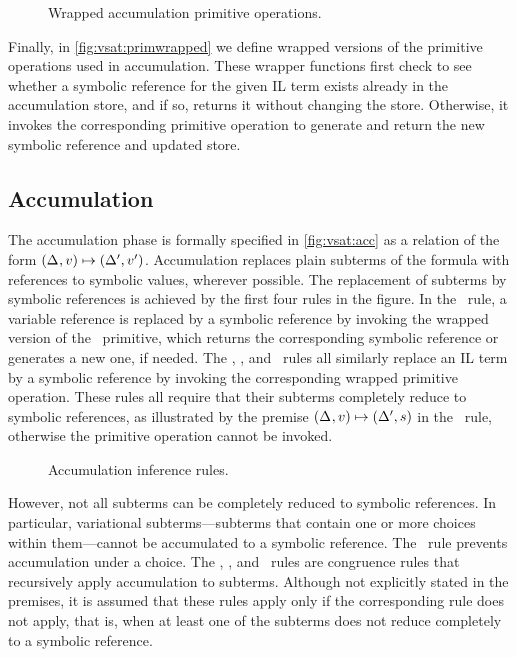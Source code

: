 \begin{figure}
  
  \caption{Wrapped accumulation primitive operations.}
  \label{fig:vsat:primwrapped}
\end{figure}


Finally, in \autoref{fig:vsat:primwrapped} we define wrapped versions of the
primitive operations used in accumulation. These wrapper functions first check
to see whether a symbolic reference for the given IL term exists already in the
accumulation store, and if so, returns it without changing the store.
Otherwise, it invokes the corresponding primitive operation to generate and
return the new symbolic reference and updated store.


\subsection{Accumulation}
%
The accumulation phase is formally specified in \autoref{fig:vsat:acc} as a
relation of the form $(\Delta_{},v)\mapsto{}(\Delta_{}',v')$.
%
Accumulation replaces plain subterms of the formula with references to symbolic
values, wherever possible. The replacement of subterms by symbolic references
is achieved by the first four rules in the figure. In the \acRef\ rule, a
variable reference is replaced by a symbolic reference by invoking the wrapped
version of the \pspawn\ primitive, which returns the corresponding symbolic
reference or generates a new one, if needed.
%
The \acNotS, \acAndS, and \acOrS\ rules all similarly replace an IL term by a
symbolic reference by invoking the corresponding wrapped primitive operation.
These rules all require that their subterms completely reduce to symbolic
references, as illustrated by the premise
$(\Delta_{},v)\mapsto{}(\Delta_{}',s)$ in the \acNotS\ rule, otherwise the
primitive operation cannot be invoked.


\begin{figure}
  
  \caption{Accumulation inference rules.}
  \label{fig:vsat:acc}
\end{figure}


However, not all subterms can be completely reduced to symbolic references. In
particular, variational subterms---subterms that contain one or more choices
within them---cannot be accumulated to a symbolic reference.
%
The \acChc\ rule prevents accumulation under a choice.
%
The \acNotV, \acAndV, and \acOrV\ rules are congruence rules that recursively
apply accumulation to subterms. Although not explicitly stated in the premises,
it is assumed that these  rules apply only if the corresponding
 rule does not apply, that is, when at least one of the subterms does
not reduce completely to a symbolic reference.



